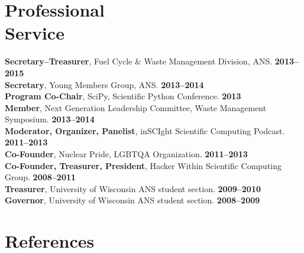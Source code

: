 \documentclass[margin,line]{resume}
\begin{document}
\begin{resume}
    \section{\mysidestyle Professional\\Service}
		\textbf{Secretary--Treasurer}, Fuel Cycle \& Waste Management Division, ANS. \hfill \textbf{2013--2015}\vspace{.5mm}\\%
		\textbf{Secretary}, Young Members Group, ANS. \hfill \textbf{2013--2014}\vspace{.5mm}\\%
		\textbf{Program Co-Chair}, SciPy, Scientific Python Conference. \hfill \textbf{2013}\vspace{.5mm}\\%
		\textbf{Member}, Next Generation Leadership Committee, Waste Management Symposium. \hfill \textbf{2013--2014}\vspace{.5mm}\\%
		\textbf{Moderator, Organizer, Panelist}, inSCIght Scientific Computing Podcast. \hfill \textbf{2011--2013}\vspace{.5mm}\\%
		\textbf{Co-Founder}, Nuclear Pride, LGBTQA Organization. \hfill \textbf{2011--2013}\vspace{.5mm}\\%
		\textbf{Co-Founder, Treasurer, President}, Hacker Within Scientific Computing Group. \hfill \textbf{2008--2011}\vspace{.5mm}\\%
		\textbf{Treasurer}, University of Wisconsin ANS student section. \hfill \textbf{2009--2010}\vspace{.5mm}\\%
		\textbf{Governor}, University of Wisconsin ANS student section. \hfill \textbf{2008--2009}\vspace{.5mm}\\\vspace{-2mm}%

\section{\mysidestyle References} 
  

\end{resume}
\end{document}
